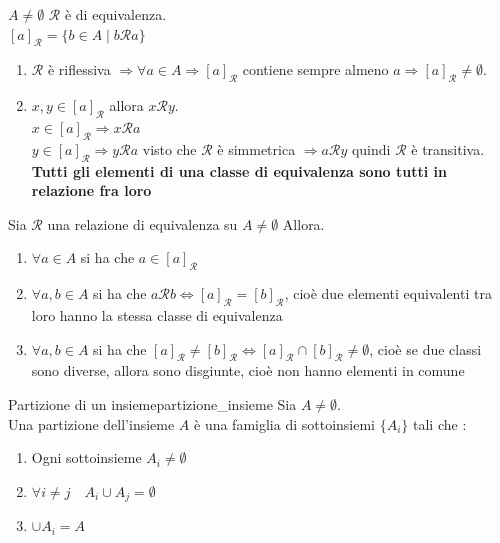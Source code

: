 \documentclass[12pt, letterpaper]{report}
\newcounter{theorem}
\newcounter{definition}
\newcommand{\nmu}{}
\begin{document}
		$A \neq \emptyset$ $\mathscr{R}$ è di equivalenza. \\
		$[a]_\mathscr{R} = \{b \in A \mid b \mathscr{R} a\}$
		\begin{enumerate}
			\item $\mathscr{R}$ è riflessiva $\Rightarrow \forall a \in A \Rightarrow [a]_\mathscr{R}$ contiene sempre almeno $a \Rightarrow [a]_\mathscr{R} \neq \emptyset$.
			\item  $x, y \in [a]_\mathscr{R}$ allora $x \mathscr{R} y$. \\
			$x \in [a]_\mathscr{R} \Rightarrow x \mathscr{R} a$ \\
			$y \in [a]_\mathscr{R} \Rightarrow y \mathscr{R} a$ visto che $\mathscr{R}$ è simmetrica $\Rightarrow a \mathscr{R} y$ quindi $\mathscr{R}$ è transitiva. \\
			\textbf{Tutti gli elementi di una classe di equivalenza sono tutti in relazione fra loro}
		\end{enumerate}
		\begin{theorem}{}{}
			Sia $\mathscr{R}$ una relazione di equivalenza su $A \neq \emptyset$ Allora.
			\begin{enumerate}
				\item $\forall a \in A$ si ha che $a \in [a]_\mathscr{R}$
				\item $\forall a,b \in A$ si ha che $a \mathscr{R} b \iff [a]_\mathscr{R} = [b]_\mathscr{R}$, cioè due elementi equivalenti tra loro hanno la stessa classe di equivalenza
				\item $\forall a, b \in A$ si ha che $[a]_\mathscr{R} \neq [b]_\mathscr{R} \iff [a]_\mathscr{R} \cap [b]_\mathscr{R} \neq \emptyset$, cioè se due classi sono diverse, allora sono disgiunte, cioè non hanno elementi in comune
			\end{enumerate}
		\end{theorem}
		\begin{definition}{\nmu Partizione di un insieme}{partizione_insieme}
			Sia $A \neq \emptyset$. \\
			Una partizione dell'insieme $A$ è una famiglia di sottoinsiemi $\{A_i\}$ tali che :
			\begin{enumerate}
				\item Ogni sottoinsieme $A_i \neq \emptyset$
				\item $\forall i \neq j \quad A_i \cup A_j = \emptyset$
				\item $\cup A_i = A$
			\end{enumerate}
		\end{definition}
\end{document}

